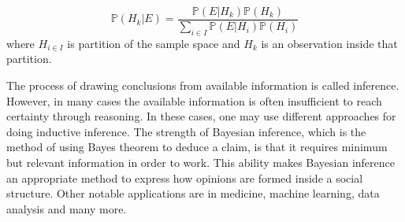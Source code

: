 $$\mathbb{P}(H_k|E) = \frac{\mathbb{P}(E|H_k)\mathbb{P}(H_k)}{\sum_{i \in I} \mathbb{P}(E|H_i) \mathbb{P}(H_i)}$$
where ${H}_{i \in I}$ is partition of the sample space and $H_k$ is an observation inside that partition.

The process of drawing conclusions from available information is called inference.  However, in  many  cases the available information is often insufficient to  reach  certainty through reasoning.  In these cases, one may use different approaches for doing inductive inference. The strength of Bayesian inference, which is the method of using Bayes theorem to deduce a claim, is that it requires minimum but relevant information in order to work. This ability makes Bayesian inference an appropriate method to express how opinions are formed inside a social structure. Other notable applications are in medicine, machine learning, data analysis and many more.